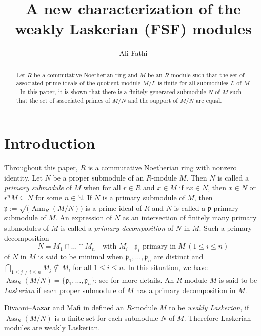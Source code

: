 \documentclass{amsart}
\theoremstyle{definition}
\numberwithin{equation}{section}
\newcommand{\ann}{\operatorname{Ann}}
\newcommand\ass {\operatorname{Ass}}
\newcommand\fp{\mathfrak p}
\newcommand\N{\mathbb N}
\begin{document}
\title[characterization  of the  weakly Laskerian (FSF) modules]{A new characterization  of the  weakly Laskerian (FSF) modules}%
\author[A.~fathi]{Ali Fathi}
\address{Department of Mathematics, Zanjan Branch,
Islamic Azad University,  Zanjan, Iran.}

\begin{abstract} Let $R$ be a commutative Noetherian ring and $M$ be an $R$-module such that the set of associated prime ideals of the quotient module $M/L$ is finite for all  submodules $L$ of $M$. In this paper, it is shown that there is a finitely generated submodule $N$ of $M$ such that the set of associated primes of $M/N$ and  the support of $M/N$ are equal.
 \end{abstract}
\maketitle
\setcounter{section}{0}
\section{\bf Introduction}


Throughout this paper, $R$ is a commutative Noetherian ring with nonzero identity.
 Let $N$ be a proper submodule of an $R$-module $M$. Then $N$ is called a {\it primary submodule} of $M$ when for all $r\in R$ and $x\in M$ if $rx\in N$, then $x\in N$ or $r^nM\subseteq N$ for some $n\in\N$. If $N$ is a primary submodule of $M$, then $\fp:=\surd(\ann_R(M/N))$
is a prime ideal of $R$ and $N$ is called a $\fp$-primary submodule of $M$.  An expression of $N$ as an intersection of finitely many primary submodules of $M$ is called a {\it primary decomposition} of $N$ in $M$.
Such a  primary decomposition
 $$N=M_1\cap\dots \cap M_n\quad \textrm {with } M_i\   \textrm{ $\fp_i$-primary in } M\ (1\leq i\leq n)$$
of $N$ in $M$ is said to  be minimal when  $\fp_1,\dots,\fp_n$ are distinct and $\bigcap_{1\leq j\neq i\leq n}M_j\nsubseteq M_i$ for all $1\leq i\leq n$. In this situation, we have $\ass_R(M/N)=\{\fp_1,\dots, \fp_n\}$; see \cite{m} for more details. An $R$-module $M$ is said to be {\it Laskerian} if each proper submodule of $M$ has a primary decomposition in $M$.

 Divaani--Aazar and Mafi in \cite{dm} defined an $R$-module $M$ to be {\it weakly Laskerian}, if $\ass_R(M/N)$ is a finite set for each submodule $N$ of $M$. Therefore Laskerian modules are weakly Laskerian.
\end{document}
